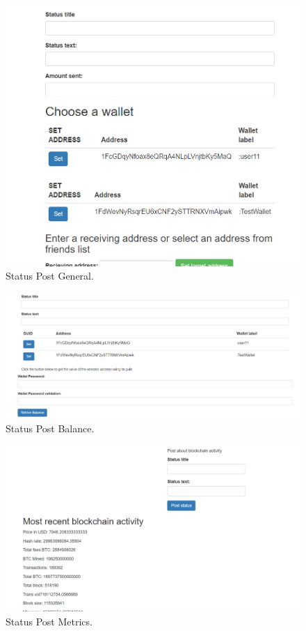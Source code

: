\begin{figure}[H]
\centering
\includegraphics[]{img/post1.png}
\caption{Status Post General.}
\end{figure}

\begin{figure}[H]
\centering
\includegraphics[]{img/post2.png}
\caption{Status Post Balance.}
\end{figure}

\begin{figure}[H]
\centering
\includegraphics[]{img/post3.png}
\caption{Status Post Metrics.}
\end{figure}

